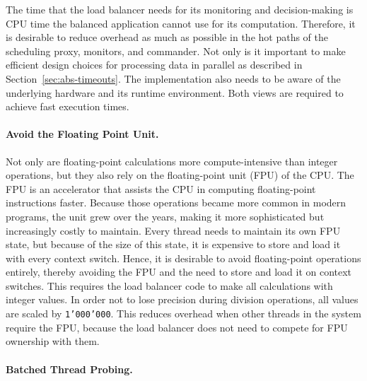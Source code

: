 The time that the load balancer needs for its monitoring and decision-making is CPU time the balanced application cannot use for its computation.
Therefore, it is desirable to reduce overhead as much as possible in the hot paths of the scheduling proxy, monitors, and commander.
Not only is it important to make efficient design choices for processing data in parallel as described in Section~\ref{sec:abs-timeouts}.
The implementation also needs to be aware of the underlying hardware and its runtime environment.
Both views are required to achieve fast execution times.

\paragraph{Avoid the Floating Point Unit.}

Not only are floating-point calculations more compute-intensive than integer operations, but they also rely on the floating-point unit (FPU) of the CPU.
The FPU is an accelerator that assists the CPU in computing floating-point instructions faster.
Because those operations became more common in modern programs, the unit grew over the years, making it more sophisticated but increasingly costly to maintain.
Every thread needs to maintain its own FPU state, but because of the size of this state, it is expensive to store and load it with every context switch.
Hence, it is desirable to avoid floating-point operations entirely, thereby avoiding the FPU and the need to store and load it on context switches.
This requires the load balancer code to make all calculations with integer values.
In order not to lose precision during division operations, all values are scaled by \texttt{1'000'000}.
This reduces overhead when other threads in the system require the FPU, because the load balancer does not need to compete for FPU ownership with them.

\paragraph{Batched Thread Probing.}
\label{sec:impl:bached-stats}

